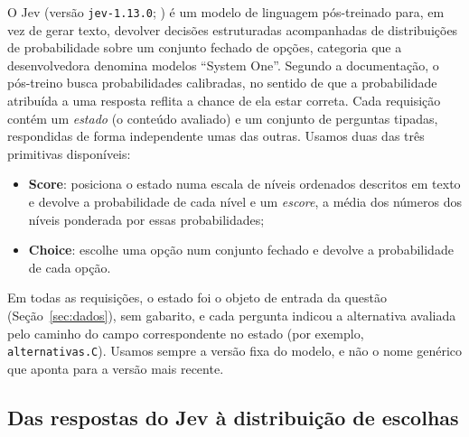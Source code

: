 O Jev (versão \texttt{jev-1.13.0}; \citealp{typesafe2026docs}) é um modelo de linguagem pós-treinado para, em vez de gerar texto, devolver decisões estruturadas acompanhadas de distribuições de probabilidade sobre um conjunto fechado de opções, categoria que a desenvolvedora denomina modelos ``System One''. Segundo a documentação, o pós-treino busca probabilidades calibradas, no sentido de que a probabilidade atribuída a uma resposta reflita a chance de ela estar correta. Cada requisição contém um \emph{estado} (o conteúdo avaliado) e um conjunto de perguntas tipadas, respondidas de forma independente umas das outras. Usamos duas das três primitivas disponíveis:
\begin{itemize}[nosep]
  \item \textbf{Score}: posiciona o estado numa escala de níveis ordenados descritos em texto e devolve a probabilidade de cada nível e um \emph{escore}, a média dos números dos níveis ponderada por essas probabilidades;
  \item \textbf{Choice}: escolhe uma opção num conjunto fechado e devolve a probabilidade de cada opção.
\end{itemize}
Em todas as requisições, o estado foi o objeto de entrada da questão (Seção~\ref{sec:dados}), sem gabarito, e cada pergunta indicou a alternativa avaliada pelo caminho do campo correspondente no estado (por exemplo, \texttt{alternativas.C}). Usamos sempre a versão fixa do modelo, e não o nome genérico que aponta para a versão mais recente.

\subsection{Das respostas do Jev à distribuição de escolhas}\label{sec:transformacao}

